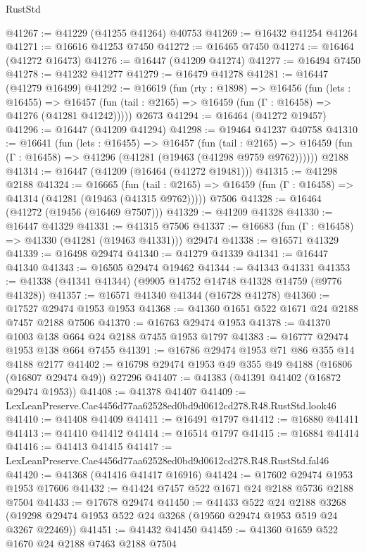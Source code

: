\begin{lexlean}{RustStd}
\begin{coremodule}
@41267 := @41229 (@41255 @41264) @40753
@41269 := @16432 @41254 @41264
@41271 := @16616 @41253 @7450
@41272 := @16465 @7450
@41274 := @16464 (@41272 @16473)
@41276 := @16447 (@41209 @41274)
@41277 := @16494 @7450
@41278 := @41232 @41277
@41279 := @16479 @41278
@41281 := @16447 (@41279 @16499)
@41292 := @16619
    (fun (rty : @1898) =>
    @16456
      (fun (lets : @16455) =>
      @16457 (fun (tail : @2165) => @16459 (fun (Γ : @16458) => @41276 (@41281 @41242)))))
    @2673
@41294 := @16464 (@41272 @19457)
@41296 := @16447 (@41209 @41294)
@41298 := @19464 @41237 @40758
@41310 := @16641
    (fun (lets : @16455) =>
    @16457
      (fun (tail : @2165) =>
      @16459 (fun (Γ : @16458) => @41296 (@41281 (@19463 (@41298 @9759 @9762))))))
    @2188
@41314 := @16447 (@41209 (@16464 (@41272 @19481)))
@41315 := @41298 @2188
@41324 := @16665
    (fun (tail : @2165) => @16459 (fun (Γ : @16458) => @41314 (@41281 (@19463 (@41315 @9762)))))
    @7506
@41328 := @16464 (@41272 (@19456 (@16469 @7507)))
@41329 := @41209 @41328
@41330 := @16447 @41329
@41331 := @41315 @7506
@41337 := @16683 (fun (Γ : @16458) => @41330 (@41281 (@19463 @41331))) @29474
@41338 := @16571 @41329
@41339 := @16498 @29474
@41340 := @41279 @41339
@41341 := @16447 @41340
@41343 := @16505 @29474 @19462
@41344 := @41343 @41331
@41353 := @41338 (@41341 @41344) (@9905 @14752 @14748 @41328 @14759 (@9776 @41328))
@41357 := @16571 @41340 @41344 (@16728 @41278)
@41360 := @17527 @29474 @1953 @1953
@41368 := @41360 @1651 @522 @1671 @24 @2188 @7457 @2188 @7506
@41370 := @16763 @29474 @1953
@41378 := @41370 @1003 @138 @664 @24 @2188 @7455 @1953 @1797
@41383 := @16777 @29474 @1953 @138 @664 @7455
@41391 := @16786 @29474 @1953 @71 @86 @355 @14 @4188 @2177
@41402 := @16798 @29474 @1953 @49 @355 @49 @4188 (@16806 (@16807 @29474 @49)) @27296
@41407 := @41383 (@41391 @41402 (@16872 @29474 @1953))
@41408 := @41378 @41407
@41409 := LexLeanPreserve.Cae4456d77aa62528ed0bd9d0612cd278.R48.RustStd.look46
@41410 := @41408 @41409
@41411 := @16491 @1797
@41412 := @16880 @41411
@41413 := @41410 @41412
@41414 := @16514 @1797
@41415 := @16884 @41414
@41416 := @41413 @41415
@41417 := LexLeanPreserve.Cae4456d77aa62528ed0bd9d0612cd278.R48.RustStd.fal46
@41420 := @41368 (@41416 @41417 @16916)
@41424 := @17602 @29474 @1953 @1953 @17606
@41432 := @41424 @7457 @522 @1671 @24 @2188 @5736 @2188 @7504
@41433 := @17678 @29474
@41450 := @41433
    @522
    @24
    @2188
    @3268
    (@19298 @29474 @1953 @522 @24 @3268 (@19560 @29474 @1953 @519 @24 @3267 @22469))
@41451 := @41432 @41450
@41459 := @41360 @1659 @522 @1670 @24 @2188 @7463 @2188 @7504

\end{coremodule}
\end{lexlean}
